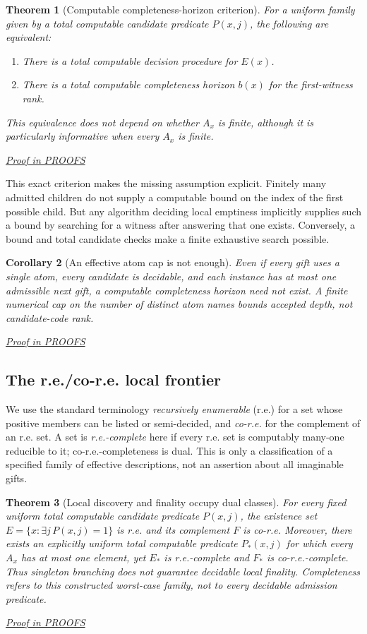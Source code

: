 \documentclass[11pt,letterpaper]{article}
\newtheorem{theorem}{Theorem}[section]
\newtheorem{corollary}[theorem]{Corollary}
\theoremstyle{definition}\newtheorem{definition}[theorem]{Definition}\newtheorem{example}[theorem]{Example}
\theoremstyle{remark}\newtheorem{remark}[theorem]{Remark}
\newcommand{\prooflink}[1]{\par\noindent\hfill\small\hyperref[#1]{\textit{Proof in PROOFS}}\normalsize}
\begin{document}
\begin{theorem}[Computable completeness-horizon criterion]\label{w3:th:horizon}
For a uniform family given by a total computable candidate predicate $P(x,j)$, the following are equivalent:
\begin{enumerate}[label=\textup{(\alph*)}]
\item There is a total computable decision procedure for $E(x)$.
\item There is a total computable completeness horizon $b(x)$ for the first-witness rank.
\end{enumerate}
This equivalence does not depend on whether $A_x$ is finite, although it is particularly informative when every $A_x$ is finite.
\prooflink{w3:pr:horizon}
\end{theorem}

This exact criterion makes the missing assumption explicit. Finitely many admitted children do not supply a computable bound on the index of the first possible child. But any algorithm deciding local emptiness implicitly supplies such a bound by searching for a witness after answering that one exists. Conversely, a bound and total candidate checks make a finite exhaustive search possible.

\begin{corollary}[An effective atom cap is not enough]\label{w3:co:atom}
Even if every gift uses a single atom, every candidate is decidable, and each instance has at most one admissible next gift, a computable completeness horizon need not exist. A finite numerical cap on the number of distinct atom names bounds accepted \emph{depth}, not candidate-code rank.
\prooflink{w3:pr:atom}
\end{corollary}

\subsection{The r.e./co-r.e. local frontier}
We use the standard terminology \emph{recursively enumerable} (r.e.) for a set whose positive members can be listed or semi-decided, and \emph{co-r.e.} for the complement of an r.e. set. A set is \emph{r.e.-complete} here if every r.e. set is computably many-one reducible to it; co-r.e.-completeness is dual. This is only a classification of a specified family of effective descriptions, not an assertion about all imaginable gifts.

\begin{theorem}[Local discovery and finality occupy dual classes]\label{w3:th:dual}
For every fixed uniform total computable candidate predicate $P(x,j)$, the existence set $E=\{x:\exists j\,P(x,j)=1\}$ is r.e. and its complement $F$ is co-r.e. Moreover, there exists an explicitly uniform total computable predicate $P_*(x,j)$ for which every $A_x$ has at most one element, yet $E_*$ is r.e.-complete and $F_*$ is co-r.e.-complete. Thus singleton branching does not guarantee decidable local finality. Completeness refers to this constructed worst-case family, not to every decidable admission predicate.
\prooflink{w3:pr:dual}
\end{theorem}
\end{document}
